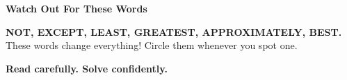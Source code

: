 {\begin{tcolorbox}[
    enhanced,
    colback=funYellowLight,
    colframe=funYellow!60,
    arc=10pt,
    boxrule=1pt,
    left=6mm, right=6mm, top=4mm, bottom=4mm,
]
{\bfseries\color{funYellowDark} \faLightbulb\hspace{2mm}Watch Out For These Words}

\vspace{2mm}

\textbf{NOT, EXCEPT, LEAST, GREATEST, APPROXIMATELY, BEST.} These words change everything! Circle them whenever you spot one.
\end{tcolorbox}

\vspace{4mm}

\begin{center}
{\large\bfseries\color{funGreenDark} \faSearch\hspace{2mm}Read carefully. Solve confidently.\hspace{2mm}\faSearch}
\end{center}

}
\newpage
